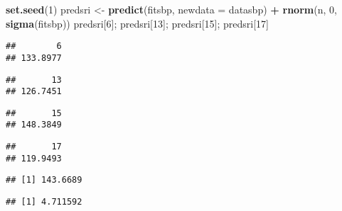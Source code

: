 \documentclass[
]{article}
\newenvironment{Shaded}{\begin{snugshade}}{\end{snugshade}}
\newcommand{\DataTypeTok}[1]{\textcolor[rgb]{0.13,0.29,0.53}{#1}}
\newcommand{\DecValTok}[1]{\textcolor[rgb]{0.00,0.00,0.81}{#1}}
\newcommand{\KeywordTok}[1]{\textcolor[rgb]{0.13,0.29,0.53}{\textbf{#1}}}
\newcommand{\NormalTok}[1]{#1}
\newcommand{\OperatorTok}[1]{\textcolor[rgb]{0.81,0.36,0.00}{\textbf{#1}}}
\newcommand{\OtherTok}[1]{\textcolor[rgb]{0.56,0.35,0.01}{#1}}
\newcommand{\StringTok}[1]{\textcolor[rgb]{0.31,0.60,0.02}{#1}}
\begin{document}
\begin{Shaded}
\begin{Highlighting}[]
\KeywordTok{set.seed}\NormalTok{(}\DecValTok{1}\NormalTok{)}
\NormalTok{predsri \textless{}{-}}\StringTok{ }\KeywordTok{predict}\NormalTok{(fitsbp, }\DataTypeTok{newdata =}\NormalTok{ datasbp) }\OperatorTok{+}\StringTok{ }\KeywordTok{rnorm}\NormalTok{(n, }\DecValTok{0}\NormalTok{, }\KeywordTok{sigma}\NormalTok{(fitsbp))}
\NormalTok{predsri[}\DecValTok{6}\NormalTok{]; predsri[}\DecValTok{13}\NormalTok{]; predsri[}\DecValTok{15}\NormalTok{]; predsri[}\DecValTok{17}\NormalTok{]}
\end{Highlighting}
\end{Shaded}

\begin{verbatim}
##        6 
## 133.8977
\end{verbatim}

\begin{verbatim}
##       13 
## 126.7451
\end{verbatim}

\begin{verbatim}
##       15 
## 148.3849
\end{verbatim}

\begin{verbatim}
##       17 
## 119.9493
\end{verbatim}

\begin{Shaded}
\end{Shaded}

\begin{verbatim}
## [1] 143.6689
\end{verbatim}

\begin{verbatim}
## [1] 4.711592
\end{verbatim}
\end{document}
